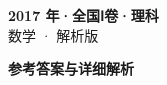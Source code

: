 \documentclass[zihao=-4, a4paper]{ctexart}
\begin{document}
\begin{center}
  {\Large\bfseries 2017 年·全国Ⅰ卷·理科}\\[4pt]
  {\large 数学 · 解析版}
\end{center}
\medskip
{}

\clearpage
{}
\begin{center}{\Large\bfseries 参考答案与详细解析}\end{center}
\medskip

\end{document}
